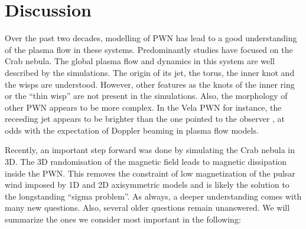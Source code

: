 \section{Discussion}
\label{sec:discussion}

Over the past two decades, modelling of PWN has lead to a good understanding of the plasma flow in these systems. Predominantly studies have focused on the Crab nebula.  The global plasma flow and dynamics in this system are well described by the simulations. The origin of its jet, the torus, the inner knot and the wisps are understood. However, other features as the knots of the inner ring or the ``thin wisp'' \cite{Hester_1995} are not present in the simulations. Also, the morphology of other PWN appears to be more complex. In the Vela PWN for instance, the receeding jet appears to be brighter than the one pointed to the observer \cite{Durant_2013}, at odds with the expectation of Doppler beaming in plasma flow models.

Recently, an important step forward was done by simulating the Crab nebula in 3D. The 3D randomisation of the magnetic field leads to magnetic dissipation inside the PWN. This removes the constraint of low magnetization of the pulsar wind imposed by 1D and 2D axisymmetric models and is likely the solution to the longstanding ``sigma problem''. As always, a deeper understanding comes with many new questions. Also, several older questions remain unanswered. We will summarize the ones we consider most important in the following: 

